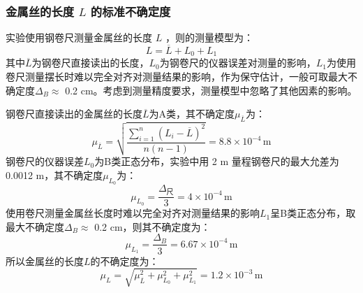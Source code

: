 \documentclass[a4paper]{extarticle}
\begin{document}
    \subsubsection{金属丝的长度 $L$ 的标准不确定度}
    \hspace{2em}
    实验使用钢卷尺测量金属丝的长度 $L$ ，则的测量模型为：
    \begin{equation*}
        L=\overline{L}+L_0+L_1
    \end{equation*}
    其中$\overline{L}$为钢卷尺直接读出的长度，$L_0$为钢卷尺的仪器误差对测量的影响，$L_1$为使用卷尺测量摆长时难以完全对齐对测量结果的影响，作为保守估计，一般可取最大不确定度$\Delta_B\approx$ 0.2 cm。考虑到测量精度要求，测量模型中忽略了其他因素的影响。
    \par\hspace{2em}
    钢卷尺直接读出的金属丝的长度$\overline{L}$为A类，其不确定度$\mu_{\overline{L}}$为：
    \begin{equation*}
        \mu_{\overline{L}}=\sqrt{\frac{\sum\limits_{i=1}^{n}(L_i-\overline{L})^2}{n(n-1)}}=8.8\times10^{-4}\,\text{m}
    \end{equation*}
    钢卷尺的仪器误差$L_0$为B类正态分布，实验中用 2 m 量程钢卷尺的最大允差为 0.0012
    m，其不确定度$\mu_{L_0}$为：
    \begin{equation*}
        \mu_{L_0}=\frac{\Delta_\text{尺}}{3}=4\times10^{-4}\,\text{m}
    \end{equation*}
    \hspace{2em}
    使用卷尺测量金属丝长度时难以完全对齐对测量结果的影响$L_1$呈B类正态分布，取最大不确定度$\Delta_B\approx$ 0.2 cm，则其不确定度为：
    \begin{equation*}
        \mu_{L_1}=\frac{\Delta_B}{3}=6.67\times10^{-4}\,\text{m}
    \end{equation*}
    \hspace{2em}
    所以金属丝的长度$L$的不确定度为：
    \begin{equation*}
        \mu_L=\sqrt{\mu_{\overline{L}}^2+\mu_{L_0}^2+\mu_{L_1}^2}=1.2\times10^{-3}\,\text{m}
    \end{equation*}
\end{document}
